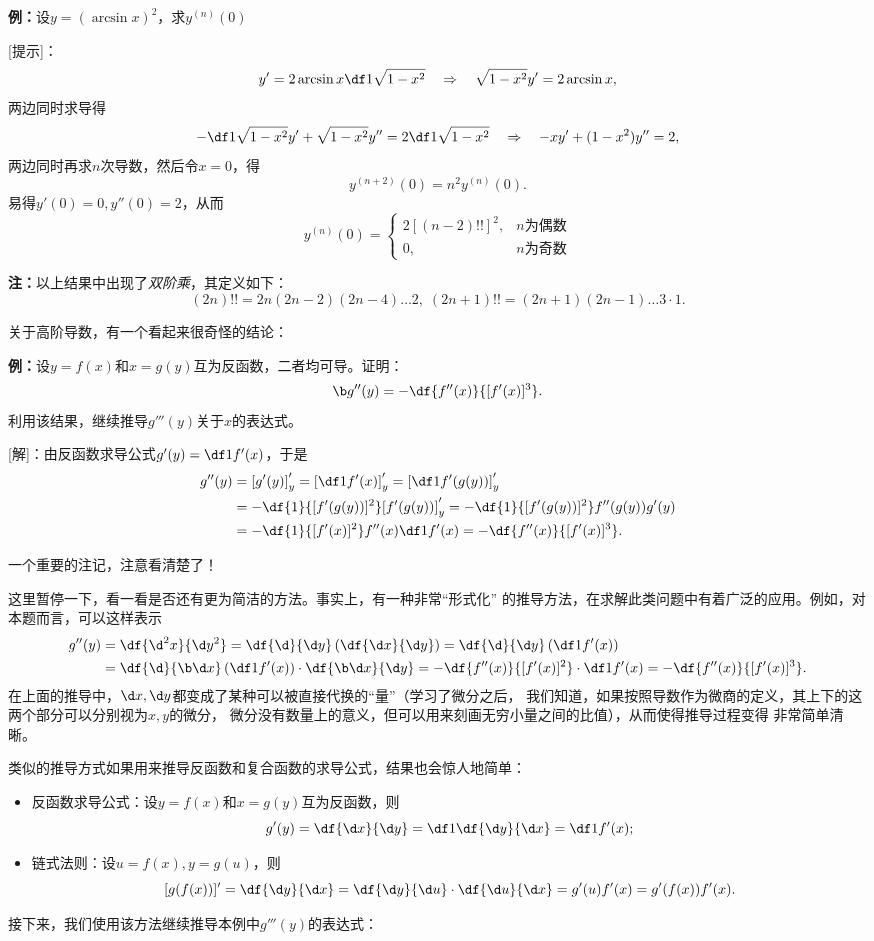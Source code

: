 {\bf 例：}设$y=(\arcsin x)^2$，求$y^{(n)}(0)$

[提示]：
$$y'=2\arcsin x\df1{\sqrt{1-x^2}}\quad
\Rightarrow\quad \sqrt{1-x^2}y'=2\arcsin x,$$
两边同时求导得
$$-\df1{\sqrt{1-x^2}}y'+\sqrt{1-x^2}y''=2\df1{\sqrt{1-x^2}}\quad
\Rightarrow\quad-xy'+(1-x^2)y''=2,$$
两边同时再求$n$次导数，然后令$x=0$，得
$$y^{(n+2)}(0)=n^2y^{(n)}(0).$$
易得$y'(0)=0,y''(0)=2$，从而
$$y^{(n)}(0)=\left\{\begin{array}{ll}
2[(n-2)!!]^2,& n\mbox{为偶数}\\
0,& n\mbox{为奇数}
\end{array}\right.$$

{\bf 注：}以上结果中出现了{\it 双阶乘}，其定义如下：
$$(2n)!!=2n(2n-2)(2n-4)\ldots2,\;(2n+1)!!=(2n+1)(2n-1)\ldots3\cdot1.$$

关于高阶导数，有一个看起来很奇怪的结论：

{\bf 例：}设$y=f(x)$和$x=g(y)$互为反函数，二者均可导。证明：
$$\b g''(y)=-\df{f''(x)}{[f'(x)]^3}.$$
利用该结果，继续推导$g'''(y)$关于$x$的表达式。

[解]：由反函数求导公式$g'(y)=\df1{f'(x)}$，于是
\begin{align*}
	g''(y)&=\left[g'(y)\right]'_y=\left[\df1{f'(x)}\right]'_y
	=\left[\df1{f'(g(y))}\right]'_y\\
	&=-\df{1}{[f'(g(y))]^2}[f'(g(y))]'_y
	=-\df{1}{[f'(g(y))]^2}f''(g(y))g'(y)\\
	&=-\df{1}{[f'(x)]^2}f''(x)\df1{f'(x)}
	=-\df{f''(x)}{[f'(x)]^3}.
\end{align*}
\begin{shaded}
	{\bb 一个重要的注记，注意看清楚了！}
	
	这里暂停一下，看一看是否还有更为简洁的方法。事实上，有一种非常“形式化”
	的推导方法，在求解此类问题中有着广泛的应用。例如，对本题而言，可以这样表示
	\begin{align*}
		g''(y)&=\df{\d^2x}{\d y^2}
		=\df{\d }{\d y}\left(\df{\d x}{\d y}\right)
		=\df{\d }{\d y}\left(\df1{f'(x)}\right)\\
		&=\df{\d }{\b\d x}\left(\df1{f'(x)}\right)\cdot\df{\b\d x}{\d y}
		=-\df{f''(x)}{[f'(x)]^2}\cdot\df1{f'(x)}
		=-\df{f''(x)}{[f'(x)]^3}.
	\end{align*}
	在上面的推导中，$\d x,\d y$都变成了某种可以被直接代换的“量”（学习了微分之后，
	我们知道，如果按照导数作为微商的定义，其上下的这两个部分可以分别视为$x,y$的微分，
	微分没有数量上的意义，但可以用来刻画无穷小量之间的比值），从而使得推导过程变得
	非常简单清晰。
	
	类似的推导方式如果用来推导反函数和复合函数的求导公式，结果也会惊人地简单：
	\begin{itemize}
	  \item 反函数求导公式：设$y=f(x)$和$x=g(y)$互为反函数，则
	  $$g'(y)=\df{\d x}{\d y}=\df1{\df{\d y}{\d x}}=\df1{f'(x)};$$
	  \item 链式法则：设$u=f(x),y=g(u)$，则
	  $$[g(f(x))]'=\df{\d y}{\d x}
	  =\df{\d y}{\d u}\cdot \df{\d u}{\d x}
	  =g'(u)f'(x)=g'(f(x))f'(x).$$
	\end{itemize}
	
	接下来，我们使用该方法继续推导本例中$g'''(y)$的表达式：
\end{shaded}

